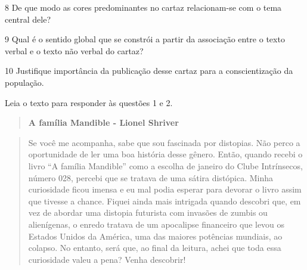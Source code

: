 \num{8} De que modo as cores predominantes no cartaz relacionam-se com o
tema central dele?


\num{9} Qual é o sentido global que se constrói a partir da associação
entre o texto verbal e o texto não verbal do cartaz?


\num{10} Justifique importância da publicação desse cartaz para a
conscientização da população.



Leia o texto para responder às questões 1 e 2.

\begin{quote}
\textbf{A família Mandible - Lionel Shriver}
\end{quote}

\begin{quote}
Se você me acompanha, sabe que sou fascinada por distopias. Não perco a
oportunidade de ler uma boa história desse gênero. Então, quando recebi
o livro ``A família Mandible'' como a escolha de janeiro do Clube
Intrínsecos, número 028, percebi que se tratava de uma sátira distópica.
Minha curiosidade ficou imensa e eu mal podia esperar para devorar o
livro assim que tivesse a chance. Fiquei ainda mais intrigada quando
descobri que, em vez de abordar uma distopia futurista com invasões de
zumbis ou alienígenas, o enredo tratava de um apocalipse financeiro que
levou os Estados Unidos da América, uma das maiores potências mundiais,
ao colapso. No entanto, será que, ao final da leitura, achei que toda
essa curiosidade valeu a pena? Venha descobrir!
\end{quote}


